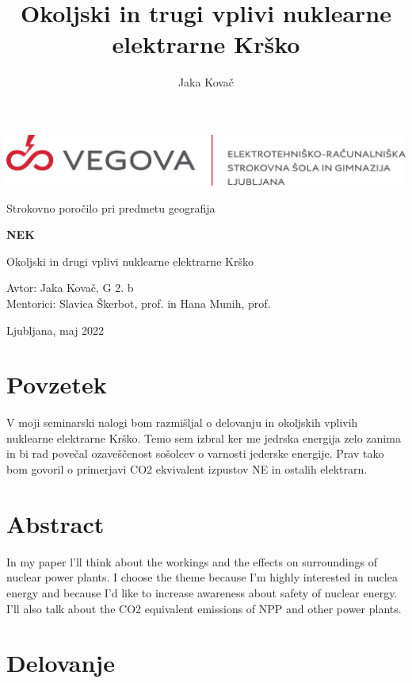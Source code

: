 \documentclass[a4paper,12pt]{article}
\title{Okoljski in trugi vplivi nuklearne elektrarne Krško}
\author{Jaka Kovač}
\begin{document}
\begin{center}
    \includegraphics[scale=0.25]{slike/logotip_vegova_leze_brezokvirja.png}

	\vspace{8cm} 

	Strokovno poročilo pri predmetu geografija

	\Huge{\textbf{NEK}}

	\normalsize
	Okoljski in drugi vplivi nuklearne elektrarne Krško

\end{center}
\vspace{9cm}
Avtor: Jaka Kovač, G 2. b\\
Mentorici: Slavica Škerbot, prof. in Hana Munih, prof.\\
\begin{center}
	Ljubljana, maj 2022
\end{center}
\newpage
\null
\newpage

\section*{Povzetek}
V moji seminarski nalogi bom razmišljal o delovanju in okoljskih vplivih nuklearne elektrarne Krško. Temo sem izbral ker me jedrska energija zelo zanima in bi rad povečal ozaveščenost sošolcev o varnosti jederske energije. Prav tako bom govoril o primerjavi CO2 ekvivalent izpustov NE in ostalih elektrarn.
\section*{Abstract}
In my paper l'll think about the workings and the effects on surroundings of nuclear power plants. I choose the theme because I'm highly interested in nuclea energy and because I'd like to increase awareness about safety of nuclear energy. I'll also talk about the CO2 equivalent emissions of NPP and other power plants.
\newpage


\tableofcontents
\newpage
\section{Delovanje}
\end{document}
